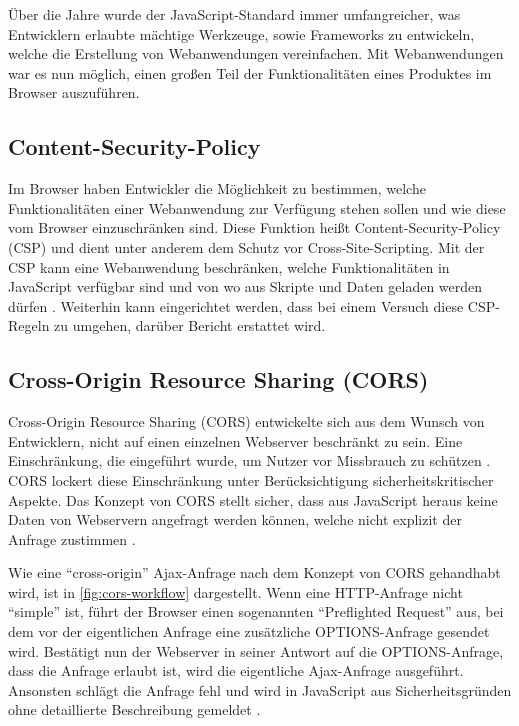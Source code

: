 Über die Jahre wurde der JavaScript-Standard immer umfangreicher, was Entwicklern erlaubte mächtige Werkzeuge, sowie Frameworks zu entwickeln, welche die Erstellung von Webanwendungen vereinfachen. Mit Webanwendungen war es nun möglich, einen großen Teil der Funktionalitäten eines Produktes im Browser auszuführen.

\subsection{Content-Security-Policy}


Im Browser haben Entwickler die Möglichkeit zu bestimmen, welche Funktionalitäten einer Webanwendung zur Verfügung stehen sollen und wie diese vom Browser einzuschränken sind. Diese Funktion heißt Content-Security-Policy (CSP) und dient unter anderem dem Schutz vor Cross-Site-Scripting. Mit der CSP kann eine Webanwendung beschränken, welche Funktionalitäten in JavaScript verfügbar sind und von wo aus Skripte und Daten geladen werden dürfen \cite{MDNContentSecurityPolicy}. Weiterhin kann eingerichtet werden, dass bei einem Versuch diese CSP-Regeln zu umgehen, darüber Bericht erstattet wird.

\subsection{Cross-Origin Resource Sharing (CORS)}

Cross-Origin Resource Sharing (CORS) \cite{AuthorizingCORS} entwickelte sich aus dem Wunsch von Entwicklern, nicht auf einen einzelnen Webserver beschränkt zu sein. Eine Einschränkung, die eingeführt wurde, um Nutzer vor Missbrauch zu schützen \cite{BrowserProtectionAgainstCSRF}. CORS lockert diese Einschränkung unter Berücksichtigung sicherheitskritischer Aspekte. Das Konzept von CORS stellt sicher, dass aus JavaScript heraus keine Daten von Webservern angefragt werden können, welche nicht explizit der Anfrage zustimmen \cite{MDNCORS}.

Wie eine \enquote{cross-origin} Ajax-Anfrage nach dem Konzept von CORS gehandhabt wird, ist in \autoref{fig:cors-workflow} dargestellt. Wenn eine HTTP-Anfrage nicht \enquote{simple}\footnotemark{} ist, führt der Browser einen sogenannten \enquote{Preflighted Request} aus, bei dem vor der eigentlichen Anfrage eine zusätzliche OPTIONS-Anfrage gesendet wird. Bestätigt nun der Webserver in seiner Antwort auf die OPTIONS-Anfrage, dass die Anfrage erlaubt ist, wird die eigentliche Ajax-Anfrage ausgeführt. Ansonsten schlägt die Anfrage fehl und wird in JavaScript aus Sicherheitsgründen ohne detaillierte Beschreibung gemeldet \cite{MDNCORS}.


